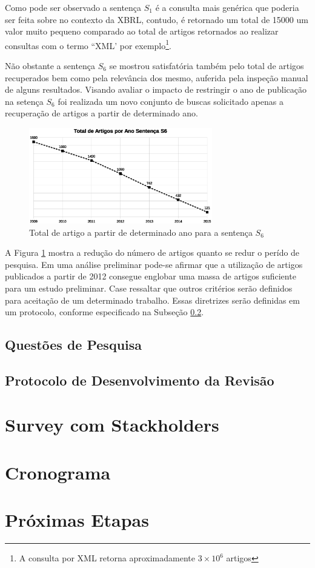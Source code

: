 \documentclass{article}
\begin{document}
Como pode ser observado a sentença $S_1$ é a consulta mais genérica que poderia ser feita sobre no contexto da XBRL, contudo, é retornado um total de 15000 um valor muito pequeno comparado ao total de artigos retornados ao realizar consultas com o termo ``XML' por exemplo\footnote{A consulta por XML retorna aproximadamente $3 \times 10^{6}$ artigos}.

Não obstante a sentença $S_6$ se mostrou satisfatória também pelo total de artigos recuperados bem como pela relevância dos mesmo, auferida pela inspeção manual de alguns resultados. Visando avaliar o impacto de restringir o ano de publicação na setença $S_6$ foi realizada um novo conjunto de buscas solicitado apenas a recuperação de artigos a partir de determinado ano. 

\begin{figure}[h] 
\label{fig:graph_artigos_ano}
\caption{Total de artigo a partir de determinado ano para a sentença $S_6$}

\includegraphics[width=8cm]{../img/graph_01.eps}
\centering
\end{figure}

A Figura \ref{fig:graph_artigos_ano} mostra a redução do número de artigos quanto se redur o perído de pesquisa. Em uma análise preliminar pode-se afirmar que a utilização de artigos publicados a partir de 2012 consegue englobar uma massa de artigos suficiente para um estudo preliminar. Case ressaltar que outros critérios serão definidos para aceitação de um determinado trabalho. Essas diretrizes serão definidas em um protocolo, conforme especificado na Subseção \ref{subsec:protocol}.

\subsection{Questões de Pesquisa}
\label{subsec:research_question}

\subsection{Protocolo de Desenvolvimento da Revisão}
\label{subsec:protocol}



\section{Survey com Stackholders}
\label{sec:survey}


\section{Cronograma}
\label{sec:cronograma}


\section{Próximas Etapas}
\label{sec:proximas_etapas}

\medskip


\end{document}
